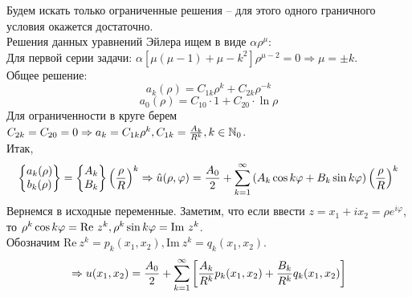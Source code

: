 Будем искать только ограниченные решения -- для этого одного граничного условия окажется достаточно.\\
Решения данных уравнений Эйлера ищем в виде $\alpha \rho^\mu$:\\
Для первой серии задачи: $\alpha[\mu(\mu-1)+\mu - k^2] \rho^{\mu-2} = 0 \Rightarrow \mu = \pm k$.\\
Общее решение:
$$ a_k(\rho) = C_{1k}\rho^k+C_{2k}\rho^{-k} $$
$$a_0(\rho) = C_{10} \cdot 1 + C_{20} \cdot \ln \rho$$
Для ограниченности в круге берем $C_{2k} = C_{20} = 0 \Rightarrow a_k = C_{1k} \rho^k, C_{1k} = \frac{A_k}{R^k}, k \in \mathbb{N}_0$.\\
Итак, 
\begin{equation}\label{16_2}
\left\{\begin{matrix} a_k(\rho)\\ b_k(\rho) \end{matrix}\right\} = \left\{\begin{matrix} A_k\\ B_k \end{matrix}\right\}\left(\frac{\rho}{R}\right)^k \Rightarrow \hat u(\rho, \varphi) = \frac{A_0}{2} + \sum_{k=1}^{\infty}\left(A_k \cos k \varphi + B_k \sin k \varphi\right) \left(\frac{\rho}{R}\right)^k  
\end{equation}
Вернемся в исходные переменные. Заметим, что если ввести $z = x_1+ix_2 = \rho e^{i \varphi}$, то $\rho^k \cos k \varphi = \mathrm{Re} \ z^k,\\ \rho^k \sin k \varphi = \mathrm{Im} \ z^k$.\\ Обозначим $\mathrm{Re} \ z^k = p_k(x_1,x_2), \mathrm{Im} \ z^k = q_k(x_1,x_2)$.
\begin{equation} \label{16_3}
\Rightarrow u(x_1,x_2) = \frac{A_0}{2}+ \sum_{k=1}^{\infty}\left[\frac{A_k}{R^k} p_k(x_1,x_2) + \frac{B_k}{R^k} q_k(x_1,x_2)\right] 
\end{equation}

